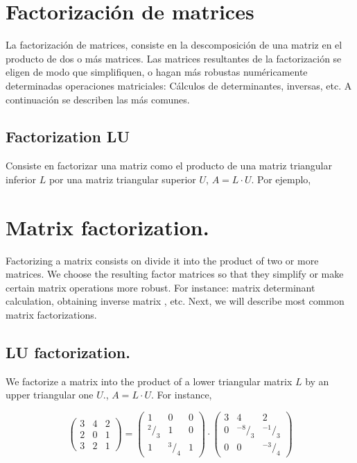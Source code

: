 \begin{paracol}{2}
\section{Factorización de matrices}\label{sec:fact}
La factorización de matrices, consiste en la descomposición de una matriz en el producto de dos o más matrices. Las matrices resultantes de la factorización se eligen de modo que simplifiquen, o hagan más robustas numéricamente determinadas operaciones matriciales: Cálculos de determinantes, inversas, etc. A continuación se describen las más comunes.

\subsection{Factorization LU}\label{sec:LU}
Consiste en factorizar una matriz como el producto de una matriz triangular inferior $L$ por una  matriz triangular superior $U$, $A=L\cdot U$. Por ejemplo,
\switchcolumn
\section{Matrix factorization.}
Factorizing a matrix consists on divide it into the product of two or more matrices. We choose the resulting factor matrices so that they simplify or make certain matrix operations more robust. For instance: matrix determinant calculation, obtaining inverse matrix , etc. Next, we will describe most common matrix factorizations.

\subsection{LU factorization.}
We factorize a matrix into the product of a lower triangular matrix $L$ by an upper triangular one $U$., $A=L\cdot U$. For instance, 

\end{paracol}
\begin{equation*}
\begin{pmatrix}
3& 4& 2\\
2& 0& 1\\
3& 2& 1
\end{pmatrix} = \begin{pmatrix}
1& 0& 0\\
^2/_3 & 1& 0\\
1& ^3/_4& 1
\end{pmatrix}\cdot \begin{pmatrix}
3& 4& 2\\
0& ^{-8}/_3& ^{-1}/_3\\
0& 0& ^{-3}/_4
\end{pmatrix}
\end{equation*}
